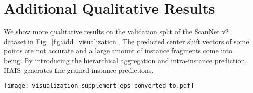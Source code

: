 \documentclass[10pt,twocolumn,letterpaper]{article}
\newcommand{\thename}{HAIS}
\begin{document}
\section{Additional Qualitative Results}
We show more qualitative results on the validation split of the ScanNet v2 dataset in Fig.~\ref{fig:add_visualization}.
The predicted center shift vectors of some points are not accurate and a large amount of instance fragments come into being. By introducing the hierarchical aggregation and intra-instance prediction, \thename\ generates fine-grained instance predictions.


\begin{figure*}[htb]
\centering
\texttt{[image: visualization\_supplement-eps-converted-to.pdf]}
\caption{Qualitative results on ScanNet v2~\cite{ScanNet}. From left to right: input point cloud, ground truth semantic label, predicted semantic label, shifted coordinate, ground truth instance mask and predicted instance mask. Best viewed in color.}
\label{fig:add_visualization}
\end{figure*}
\end{document}
